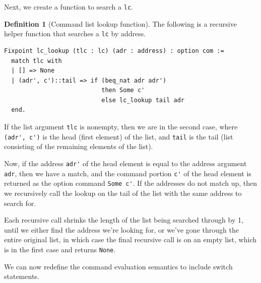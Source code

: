 \documentclass[12pt,notitlepage]{report}
\theoremstyle{plain}
\theoremstyle{definition}
\newtheorem{defin}[theo]{Definition}
\numberwithin{equation}{section}
\begin{document}
Next, we create a function to search a \verb$lc$.

\begin{defin}[Command list lookup function]
The following is a recursive helper function that searches a \verb$lc$ by address.
\begin{verbatim}Fixpoint lc_lookup (tlc : lc) (adr : address) : option com :=
  match tlc with
  | [] => None
  | (adr', c')::tail => if (beq_nat adr adr') 
                           then Some c'
                           else lc_lookup tail adr
  end.\end{verbatim}
  If the list argument \verb$tlc$ is nonempty, then we are in the second case, where \verb$(adr', c')$ is the head (first element) of the list, and \verb$tail$ is the tail (list consisting of the remaining elements of the list).  
  \par Now, if the address \verb$adr'$ of the head element is equal to the address argument \verb$adr$, then we have a match, and the command portion \verb$c'$ of the head element is returned as the option command \verb$Some c'$.  If the addresses do not match up, then we recursively call the lookup on the tail of the list with the same address to search for.
  \par Each recursive call shrinks the length of the list being searched through by 1, until we either find the address we're looking for, or we've gone through the entire original list, in which case the final recursive call is on an empty list, which is in the first case and returns \verb$None$.
\end{defin}

We can now redefine the command evaluation semantics to include switch statements.
\end{document}
